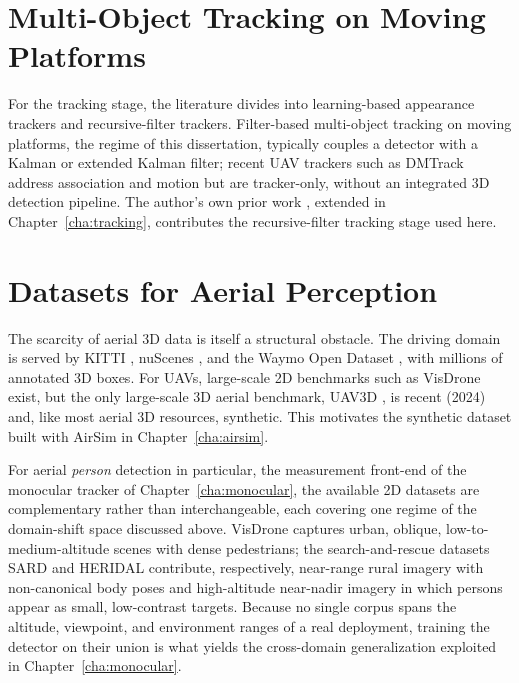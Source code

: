 \section{Multi-Object Tracking on Moving Platforms}

For the tracking stage, the literature divides into learning-based
appearance trackers and recursive-filter trackers. Filter-based multi-object
tracking on moving platforms, the regime of this dissertation, typically
couples a detector with a Kalman or extended Kalman filter; recent UAV trackers
such as DMTrack \cite{fu2025dmtrack} address association and motion but are
tracker-only, without an integrated 3D detection pipeline. The author's own prior
work \cite{delima2025fusion}, extended in Chapter~\ref{cha:tracking}, contributes
the recursive-filter tracking stage used here.

\section{Datasets for Aerial Perception}
\label{sec:slr_datasets}

The scarcity of aerial 3D data is itself a structural obstacle. The driving
domain is served by KITTI \cite{geiger2012kitti}, nuScenes
\cite{caesar2020nuscenes}, and the Waymo Open Dataset \cite{sun2020waymo}, with
millions of annotated 3D boxes. For UAVs, large-scale 2D benchmarks such as
VisDrone \cite{zhu2021visdrone} exist, but the only large-scale 3D aerial
benchmark, UAV3D \cite{ye2024uav3d}, is recent (2024) and, like most aerial 3D
resources, synthetic. This
motivates the synthetic dataset built with AirSim \cite{shah2018airsim} in
Chapter~\ref{cha:airsim}.

For aerial \emph{person} detection in particular, the measurement front-end of
the monocular tracker of Chapter~\ref{cha:monocular}, the available 2D datasets
are complementary rather than interchangeable, each covering one regime of the
domain-shift space discussed above. VisDrone \cite{zhu2021visdrone} captures
urban, oblique, low-to-medium-altitude scenes with dense pedestrians; the
search-and-rescue datasets SARD \cite{sambolek2021sard} and HERIDAL
\cite{bozic2019heridal} contribute, respectively, near-range rural imagery with
non-canonical body poses and high-altitude near-nadir imagery in which persons
appear as small, low-contrast targets. Because no single corpus spans the
altitude, viewpoint, and environment ranges of a real deployment, training the
detector on their union is what yields the cross-domain generalization exploited
in Chapter~\ref{cha:monocular}.

